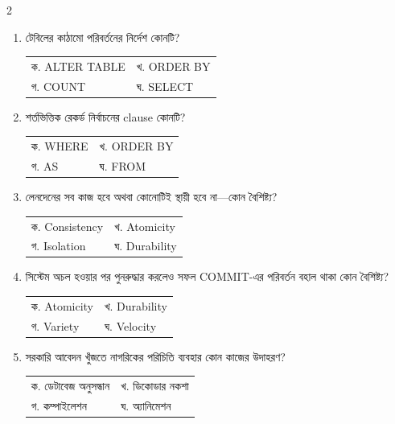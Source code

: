 \begin{multicols}{2}
\begin{enumerate}
\item \begin{minipage}[t]{\linewidth}
টেবিলের কাঠামো পরিবর্তনের নির্দেশ কোনটি?
\par
\begin{tabularx}{\linewidth}{@{}X X@{}}
ক. ALTER TABLE & খ. ORDER BY \\
গ. COUNT & ঘ. SELECT \\
\end{tabularx}
\end{minipage}
\vspace{1pt}

\item \begin{minipage}[t]{\linewidth}
শর্তভিত্তিক রেকর্ড নির্বাচনের clause কোনটি?
\par
\begin{tabularx}{\linewidth}{@{}X X@{}}
ক. WHERE & খ. ORDER BY \\
গ. AS & ঘ. FROM \\
\end{tabularx}
\end{minipage}
\vspace{1pt}

\item \begin{minipage}[t]{\linewidth}
লেনদেনের সব কাজ হবে অথবা কোনোটিই স্থায়ী হবে না—কোন বৈশিষ্ট্য?
\par\begin{tabularx}{\linewidth}{@{}X X@{}}
ক. Consistency & খ. Atomicity \\
গ. Isolation & ঘ. Durability \\
\end{tabularx}
\end{minipage}
\vspace{1pt}

\item \begin{minipage}[t]{\linewidth}
সিস্টেম অচল হওয়ার পর পুনরুদ্ধার করলেও সফল COMMIT-এর পরিবর্তন বহাল থাকা কোন বৈশিষ্ট্য?
\par\begin{tabularx}{\linewidth}{@{}X X@{}}
ক. Atomicity & খ. Durability \\
গ. Variety & ঘ. Velocity \\
\end{tabularx}
\end{minipage}
\vspace{1pt}

\item \begin{minipage}[t]{\linewidth}
সরকারি আবেদন খুঁজতে নাগরিকের পরিচিতি ব্যবহার কোন কাজের উদাহরণ?
\par
\begin{tabularx}{\linewidth}{@{}X X@{}}
ক. ডেটাবেজ অনুসন্ধান & খ. ডিকোডার নকশা \\
গ. কম্পাইলেশন & ঘ. অ্যানিমেশন \\
\end{tabularx}
\end{minipage}
\vspace{1pt}


\end{enumerate}
\end{multicols}
